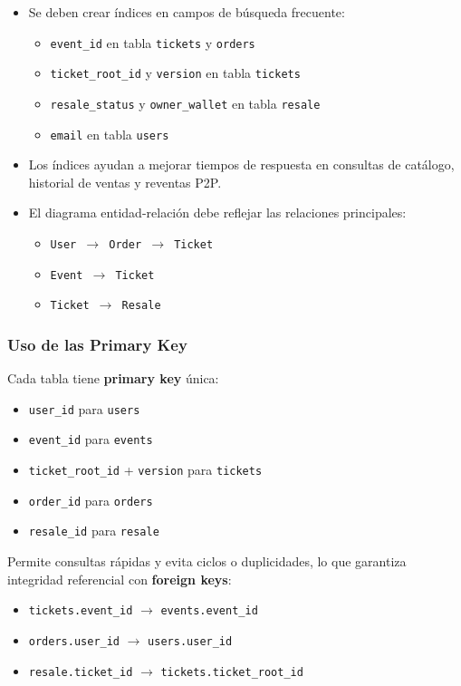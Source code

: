 \documentclass[12pt,letterpaper]{article}
\begin{document}
\begin{itemize}
    \item Se deben crear índices en campos de búsqueda frecuente:
    \begin{itemize}
        \item \texttt{event\_id} en tabla \texttt{tickets} y \texttt{orders}
        \item \texttt{ticket\_root\_id} y \texttt{version} en tabla \texttt{tickets}
        \item \texttt{resale\_status} y \texttt{owner\_wallet} en tabla \texttt{resale}
        \item \texttt{email} en tabla \texttt{users}
    \end{itemize}
    \item Los índices ayudan a mejorar tiempos de respuesta en consultas de catálogo, historial de ventas y reventas P2P.
    \item El diagrama entidad-relación debe reflejar las relaciones principales:
    \begin{itemize}
        \item \texttt{User $\rightarrow$ Order $\rightarrow$ Ticket}
        \item \texttt{Event $\rightarrow$ Ticket}
        \item \texttt{Ticket $\rightarrow$ Resale}
    \end{itemize}
\end{itemize}

\subsubsection{Uso de las Primary Key}
Cada tabla tiene \textbf{primary key} única:
\begin{itemize}
    \item \texttt{user\_id} para \texttt{users}
    \item \texttt{event\_id} para \texttt{events}
    \item \texttt{ticket\_root\_id} + \texttt{version} para \texttt{tickets}
    \item \texttt{order\_id} para \texttt{orders}
    \item \texttt{resale\_id} para \texttt{resale}
\end{itemize}

Permite consultas rápidas y evita ciclos o duplicidades, lo que garantiza integridad referencial con \textbf{foreign keys}:
\begin{itemize}
    \item \texttt{tickets.event\_id} $\rightarrow$ \texttt{events.event\_id}
    \item \texttt{orders.user\_id} $\rightarrow$ \texttt{users.user\_id}
    \item \texttt{resale.ticket\_id} $\rightarrow$ \texttt{tickets.ticket\_root\_id}
\end{itemize}
\end{document}
